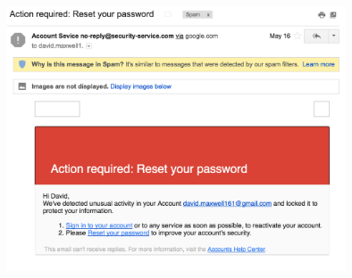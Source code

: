 \documentclass[nobackground,dvipsnames,table,aspectratio=169]{beamer}
\begin{document}
\begin{frame}{}
\begin{columns}
            \includegraphics[width=0.75\textwidth]{susmail4}
    \end{columns}
\end{frame}

\begin{frame}{}
    \thispagestyle{empty}
    \centering
\end{frame}

\begin{frame}{}
    \thispagestyle{empty}
    \centering
\end{frame}
\end{document}
